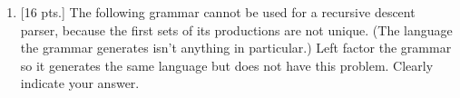 \documentclass[11pt]{article}
\begin{document}
  \begin{enumerate}



    \item {[16 pts.]} The following grammar cannot be used for a recursive
          descent parser, because the first sets of its productions are not
          unique.  (The language the grammar generates isn't anything in
          particular.)  Left factor the grammar so it generates the same
          language but does not have this problem.  Clearly indicate your
          answer.

          \vspace{-6.5mm}

          \begin{center}

            \begin{grammar}

                \\


\end{grammar}
\end{center}
\end{enumerate}
\end{document}
